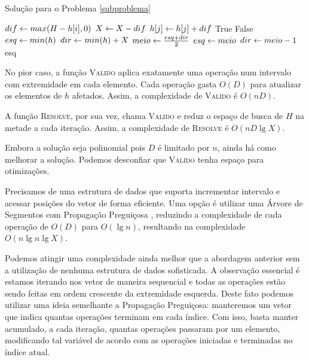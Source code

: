 \begin{algorithm}[H]
\caption{Solução para o Problema \ref{subproblema}}
\label{subproblema:code}
\begin{algorithmic}[1]
        \State $dif \leftarrow max(H - h[i], 0)$
        \State $X \leftarrow X - dif$
            \State $h[j] \leftarrow h[j] + dif$
        \EndFor
    \EndFor
        \State \Return True
    \Else
        \State \Return False
    \EndIf
\EndFunction
{}
    \State $esq \leftarrow min(h)$
    \State $dir \leftarrow min(h) + X$
        \State $meio \leftarrow \frac{esq + dir}{2}$
            \State $esq \leftarrow meio$
        \Else
            \State $dir \leftarrow meio - 1$
        \EndIf
    \EndWhile
    \State \Return esq
\EndFunction
\end{algorithmic}
\end{algorithm}

No pior caso, a função \textsc{Valido} aplica exatamente uma operação num intervalo com extremidade em cada elemento. Cada operação gasta $O(D)$ para atualizar os elementos de $h$ afetados. Assim, a complexidade de \textsc{Valido} é $O(nD)$.

A função \textsc{Resolve}, por sua vez, chama \textsc{Valido} e reduz o espaço de busca de $H$ na metade a cada iteração. Assim, a complexidade de \textsc{Resolve} é $O(nD \lg X)$.

Embora a solução seja polinomial pois $D$ é limitado por $n$, ainda há como melhorar a solução. Podemos desconfiar que \textsc{Valido} tenha espaço para otimizações. 

Precisamos de uma estrutura de dados que suporta incrementar intervalo e acessar posições do vetor de forma eficiente. Uma opção é utilizar uma Árvore de Segmentos com Propagação Preguiçosa \cite{mehta2004handbook}, reduzindo a complexidade de cada operação de $O(D)$ para $O(\lg n)$, resultando na complexidade $O(n \lg n \lg X)$.

Podemos atingir uma complexidade ainda melhor que a abordagem anterior sem a utilização de nenhuma estrutura de dados sofisticada. A observação essencial é estamos iterando nos vetor de maneira sequencial e todas as operações estão sendo feitas em ordem crescente da extremidade esquerda. Deste fato podemos utilizar uma ideia semelhante a Propagação Preguiçosa: manteremos um vetor que indica quantas operações terminam em cada índice. Com isso, basta manter acumulado, a cada iteração, quantas operações passaram por um elemento, modificando tal variável de acordo com as operações iniciadas e terminadas no índice atual.

